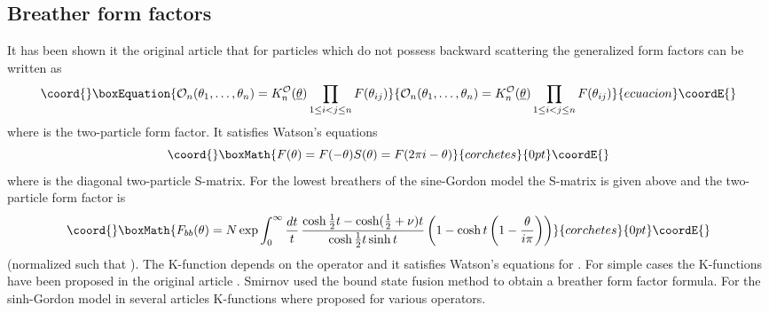 \documentclass[a4paper,12pt]{article}
\begin{document}
\subsection*{Breather form factors}

It has been shown it the original article \cite{KW} that for particles which
do not possess backward scattering the generalized form factors can be
written as 
\begin{equation}\coord{}\boxEquation{
\mathcal{O}_{n}(\theta _{1},\dots ,\theta _{n})=K_{n}^{\mathcal{O}}(
\underline{\theta })\prod_{1\leq i<j\leq n}F(\theta _{ij})  \label{2}
}{
\mathcal{O}_{n}(\theta _{1},\dots ,\theta _{n})=K_{n}^{\mathcal{O}}(
\underline{\theta })\prod_{1\leq i<j\leq n}F(\theta _{ij})  }{ecuacion}\coordE{}\end{equation}
where \coordHE{} is the two-particle form factor. It satisfies Watson's
equations 
\[\coord{}\boxMath{
F(\theta )=F(-\theta )S(\theta )=F(2\pi i-\theta )
}{corchetes}{0pt}\coordE{}\]
where \coordHE{} is the diagonal two-particle S-matrix. For the lowest
breathers of the sine-Gordon model the S-matrix is given above and the
two-particle form factor is \cite{KW} 
\[\coord{}\boxMath{
F_{bb}(\theta )=N\exp \int_{0}^{\infty }\frac{dt}{t}\,\frac{\cosh \frac{1}{2}%
t-\cosh (\frac{1}{2}+\nu )t}{\cosh \frac{1}{2}t\sinh t}\left( 1-\cosh
t\left( 1-\frac{\theta }{i\pi }\right) \right) 
}{corchetes}{0pt}\coordE{}\]
(normalized such that \coordHE{}). The K-function \coordHE{} depends on the operator and it satisfies Watson's
equations for \coordHE{}. For simple cases the K-functions have been proposed in
the original article \cite{KW}. Smirnov \cite{Sm} used the bound state fusion
method to obtain a breather form factor formula. For the sinh-Gordon model
in several articles \cite{FMS,KM,MS,BL} K-functions where proposed for
various operators.
\end{document}
